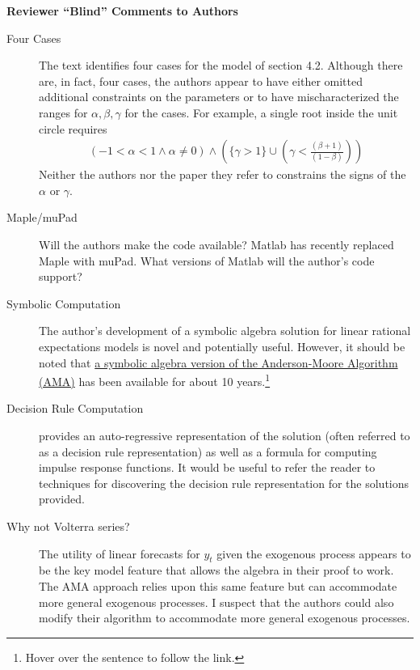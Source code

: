 \documentclass[12pt]{article}
\begin{document}
\centerline{\large\bf Reviewer ``Blind'' Comments to Authors}

\begin{description}
\item[Four Cases] The text identifies four cases for the model of section
4.2.  Although there are, in fact, four cases, the authors appear to 
have either omitted additional constraints on the parameters or to have 
mischaracterized the ranges for $\alpha, \beta, \gamma$ for the cases.  
For example, a single root inside the unit circle requires
\begin{gather*}
(-1<\alpha<1 \wedge \alpha \ne 0) \wedge \left (
\{\gamma > 1\} \cup \left ( \gamma < \frac{(\beta +1)}{(1-\beta )}\right)\right)
\end{gather*}
Neither the authors nor the 
paper they refer to \cite{Leeper91} 
constrains the signs of the $\alpha$ or $\gamma$.

\item[Maple/muPad] Will the authors make the code available?
Matlab has recently replaced Maple with muPad.  What versions of
Matlab will the author's code support?  

\item[Symbolic Computation] The author's development of a symbolic algebra
solution for linear rational expectations models 
is novel and potentially useful.  However, it should be noted that  \href{http://www.federalreserve.gov/pubs/oss/oss4/papers/reliableMath/reliableMath.html}{ a symbolic algebra version of the Anderson-Moore Algorithm (AMA)} has been available for about 10 years.\footnote{Hover over the sentence to follow the link.}

\item[Decision Rule Computation] \cite{Anderson10} provides 
an auto-regressive representation of the solution (often referred to as 
a decision rule representation) as well as a formula for computing impulse 
response functions. It would be useful to  refer 
the reader to techniques for discovering the decision rule
representation for the solutions provided.



\item[Why not Volterra series?] The utility of linear forecasts
for  $y_t$ given the exogenous
process appears to be the key model feature that allows the 
algebra in their proof to work.  The AMA approach relies upon this 
same feature but can accommodate more general exogenous processes.
I suspect that the authors could also modify their
algorithm to accommodate more general exogenous processes.



\end{description}
\end{document}
